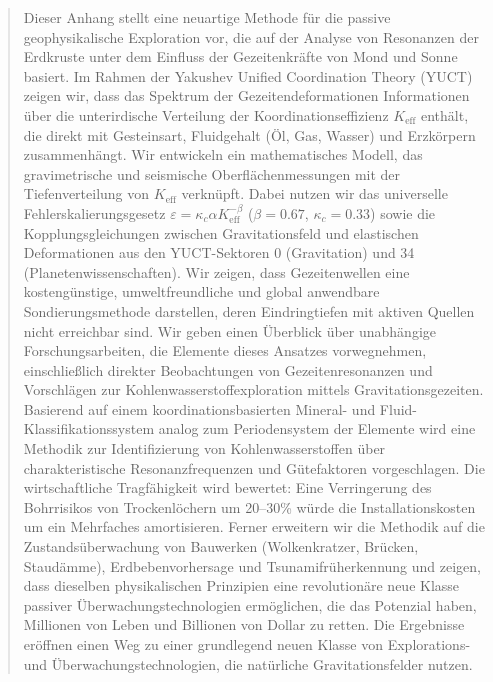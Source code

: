 \documentclass[12pt,a4paper]{article}
\theoremstyle{remark}
\newcommand{\Keff}{K_{\mathrm{eff}}}
\newcommand{\kappac}{\kappa_c}
\newcommand{\eps}{\varepsilon}
\begin{document}
\begin{titlepage}
\begin{center}
			\begin{minipage}{0.9\textwidth}
				\begin{abstract}
					\noindent
					Dieser Anhang stellt eine neuartige Methode für die passive geophysikalische Exploration vor, die auf der Analyse von Resonanzen der Erdkruste unter dem Einfluss der Gezeitenkräfte von Mond und Sonne basiert. Im Rahmen der Yakushev Unified Coordination Theory (YUCT) zeigen wir, dass das Spektrum der Gezeitendeformationen Informationen über die unterirdische Verteilung der Koordinationseffizienz $\Keff$ enthält, die direkt mit Gesteinsart, Fluidgehalt (Öl, Gas, Wasser) und Erzkörpern zusammenhängt. Wir entwickeln ein mathematisches Modell, das gravimetrische und seismische Oberflächenmessungen mit der Tiefenverteilung von $\Keff$ verknüpft. Dabei nutzen wir das universelle Fehlerskalierungsgesetz $\eps = \kappac \alpha \Keff^{-\beta}$ ($\beta=0.67$, $\kappac=0.33$) sowie die Kopplungsgleichungen zwischen Gravitationsfeld und elastischen Deformationen aus den YUCT-Sektoren 0 (Gravitation) und 34 (Planetenwissenschaften). Wir zeigen, dass Gezeitenwellen eine kostengünstige, umweltfreundliche und global anwendbare Sondierungsmethode darstellen, deren Eindringtiefen mit aktiven Quellen nicht erreichbar sind. Wir geben einen Überblick über unabhängige Forschungsarbeiten, die Elemente dieses Ansatzes vorwegnehmen, einschließlich direkter Beobachtungen von Gezeitenresonanzen und Vorschlägen zur Kohlenwasserstoffexploration mittels Gravitationsgezeiten. Basierend auf einem koordinationsbasierten Mineral- und Fluid-Klassifikationssystem analog zum Periodensystem der Elemente wird eine Methodik zur Identifizierung von Kohlenwasserstoffen über charakteristische Resonanzfrequenzen und Gütefaktoren vorgeschlagen. Die wirtschaftliche Tragfähigkeit wird bewertet: Eine Verringerung des Bohrrisikos von Trockenlöchern um 20–30\% würde die Installationskosten um ein Mehrfaches amortisieren. Ferner erweitern wir die Methodik auf die Zustandsüberwachung von Bauwerken (Wolkenkratzer, Brücken, Staudämme), Erdbebenvorhersage und Tsunamifrüherkennung und zeigen, dass dieselben physikalischen Prinzipien eine revolutionäre neue Klasse passiver Überwachungstechnologien ermöglichen, die das Potenzial haben, Millionen von Leben und Billionen von Dollar zu retten. Die Ergebnisse eröffnen einen Weg zu einer grundlegend neuen Klasse von Explorations- und Überwachungstechnologien, die natürliche Gravitationsfelder nutzen.
				\end{abstract}
			\end{minipage}
			

\end{center}
\end{titlepage}
\end{document}
